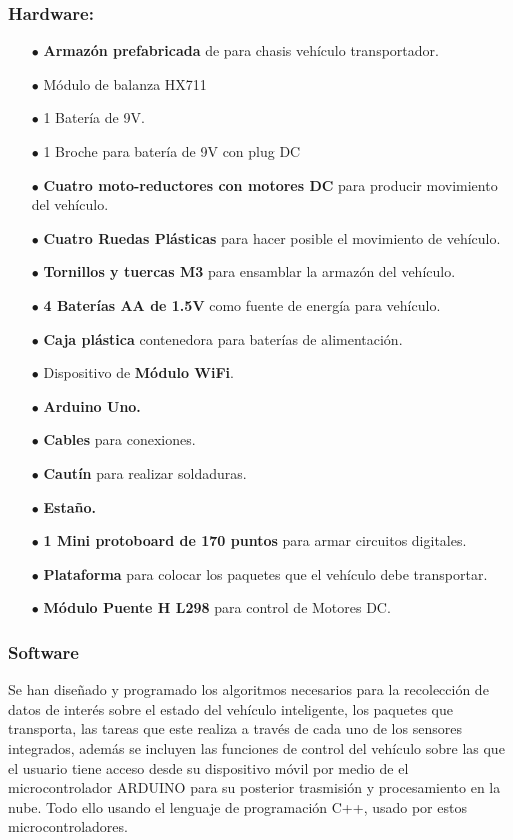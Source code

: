 \documentclass[osajnl,twocolumn,showpacs,superscriptaddress,10pt]{revtex4-1}
\begin{document}
\subsubsection{Hardware:}
\begin{itemize}
    \item[$\bullet$]\textbf{Armazón prefabricada} de para chasis vehículo transportador.
    \item[$\bullet$]Módulo de balanza HX711
    \item[$\bullet$]1 Batería de 9V.
    \item[$\bullet$]1 Broche para batería de 9V con plug DC
    \item[$\bullet$]\textbf{Cuatro moto-reductores con motores DC} para producir movimiento del vehículo.
    \item[$\bullet$]\textbf{Cuatro Ruedas Plásticas} para hacer posible el movimiento de vehículo.
    \item[$\bullet$]\textbf{Tornillos y tuercas M3} para ensamblar la armazón del vehículo.
    \item[$\bullet$]\textbf{4 Baterías AA de 1.5V} como fuente de energía para vehículo.
    \item[$\bullet$]\textbf{Caja plástica} contenedora para baterías de alimentación.
    \item[$\bullet$]Dispositivo de \textbf{Módulo WiFi}.
    \item[$\bullet$]\textbf{Arduino Uno.}
    \item[$\bullet$]\textbf{Cables} para conexiones.
    \item[$\bullet$]\textbf{Cautín} para realizar soldaduras.
    \item[$\bullet$]\textbf{Estaño.}
    \item[$\bullet$]\textbf{1 Mini protoboard de 170 puntos} para armar circuitos digitales.
    \item[$\bullet$]\textbf{Plataforma} para colocar los paquetes que el vehículo debe transportar.
    \item[$\bullet$]\textbf{Módulo Puente H L298 }para control de Motores DC.

\end{itemize}
\subsubsection{Software}
    Se han diseñado y programado los algoritmos necesarios para la recolección de datos de interés sobre el estado del vehículo inteligente, los paquetes que transporta, las tareas que este realiza a través de cada uno de los sensores integrados, además se incluyen las funciones de control del vehículo sobre las que el usuario tiene acceso desde su dispositivo móvil por medio de el microcontrolador ARDUINO para su posterior trasmisión y procesamiento en la nube. Todo ello usando el lenguaje de programación C++, usado por estos microcontroladores.
    
\end{document}
